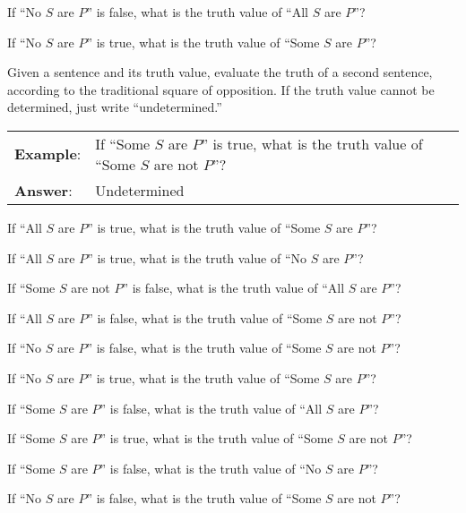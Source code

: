 \begin{exercises}
\item If ``No $S$ are $P$'' is false, what is the truth value of ``All $S$ are $P$''?

\item If ``No $S$ are $P$'' is true, what is the truth value of ``Some $S$ are $P$''?

\end{exercises}

\noindent \problempart Given a sentence and its truth value, evaluate the truth of a second sentence, according to the traditional square of opposition. If the truth value cannot be determined, just write ``undetermined.''

\begin{longtabu}{p{.1\linewidth}p{.9\linewidth}}
\textbf{Example}: & If ``Some $S$ are $P$'' is true, what is the truth value of ``Some $S$ are not $P$''?\\
\textbf{Answer}: & Undetermined\\
\end{longtabu}

\begin{exercises}
\item If ``All $S$ are $P$'' is true, what is the truth value of ``Some $S$ are $P$''? %
\item If ``All $S$ are $P$'' is true, what is the truth value of ``No $S$ are $P$''? %
\item If ``Some $S$ are not $P$'' is false, what is the truth value of ``All $S$ are $P$''? %
\item If ``All $S$ are $P$'' is false, what is the truth value of ``Some $S$ are not $P$''?  %
\item If ``No $S$ are $P$'' is false, what is the truth value of ``Some $S$ are not $P$''? %
\item If ``No $S$ are $P$'' is true, what is the truth value of ``Some $S$ are $P$''? %
\item If ``Some $S$ are $P$'' is false, what is the truth value of ``All $S$ are $P$''? %
\item If ``Some $S$ are $P$'' is true, what is the truth value of ``Some $S$ are not $P$''? %
\item If ``Some $S$ are $P$'' is false, what is the truth value of ``No $S$ are $P$''? %
\item If ``No $S$ are $P$'' is false, what is the truth value of ``Some $S$ are not $P$''? %
\end{exercises}


